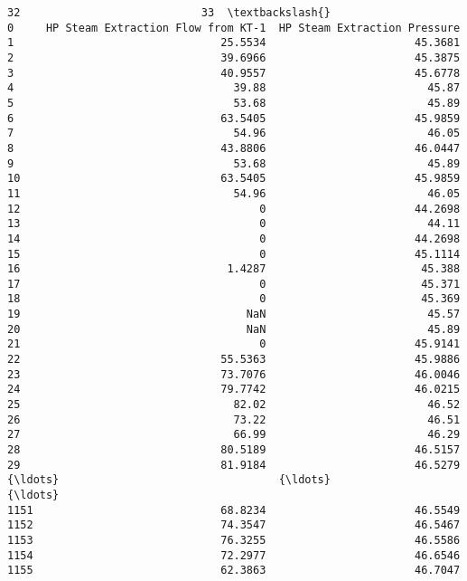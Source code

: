 \documentclass[11pt]{article}
\begin{document}
\begin{tcolorbox}[breakable, size=fbox, boxrule=.5pt, pad at break*=1mm, opacityfill=0]
\begin{Verbatim}[commandchars=\\\{\}]
                                      32                            33  \textbackslash{}
0     HP Steam Extraction Flow from KT-1  HP Steam Extraction Pressure
1                                25.5534                       45.3681
2                                39.6966                       45.3875
3                                40.9557                       45.6778
4                                  39.88                         45.87
5                                  53.68                         45.89
6                                63.5405                       45.9859
7                                  54.96                         46.05
8                                43.8806                       46.0447
9                                  53.68                         45.89
10                               63.5405                       45.9859
11                                 54.96                         46.05
12                                     0                       44.2698
13                                     0                         44.11
14                                     0                       44.2698
15                                     0                       45.1114
16                                1.4287                        45.388
17                                     0                        45.371
18                                     0                        45.369
19                                   NaN                         45.57
20                                   NaN                         45.89
21                                     0                       45.9141
22                               55.5363                       45.9886
23                               73.7076                       46.0046
24                               79.7742                       46.0215
25                                 82.02                         46.52
26                                 73.22                         46.51
27                                 66.99                         46.29
28                               80.5189                       46.5157
29                               81.9184                       46.5279
{\ldots}                                  {\ldots}                           {\ldots}
1151                             68.8234                       46.5549
1152                             74.3547                       46.5467
1153                             76.3255                       46.5586
1154                             72.2977                       46.6546
1155                             62.3863                       46.7047

\end{Verbatim}
\end{tcolorbox}
\end{document}
